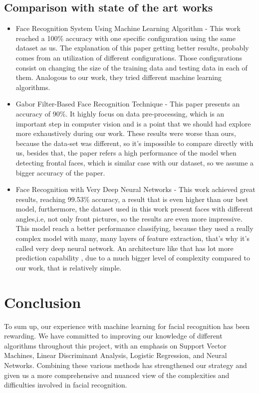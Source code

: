 \documentclass[12pt,a4paper,twocolumn]{article}
\begin{document}
\subsection{Comparison with state of the art works}
\begin{itemize}
    \item Face Recognition System Using Machine Learning Algorithm \cite{state1} - This work reached a 100\% accuracy with one specific configuration using the same dataset as us. The explanation of this paper getting better results, probably comes from an utilization of different configurations. Those configurations consist on  changing the size of the training data and testing data in each of them. Analogous to our work, they tried different machine learning algorithms.
    \item Gabor Filter-Based Face Recognition Technique\cite{state2} - This paper presents an accuracy of 90\%. It highly focus on data pre-processing, which is an important step in computer vision and is a point that we should had explore more exhaustively during our work. These results were worse than ours, because the data-set was different, so it's impossible to compare directly with us, besides that, the paper refers a high performance of the model when detecting frontal faces, which is similar case with our dataset, so we assume a bigger accuracy of the paper.
    \item  Face Recognition with Very Deep Neural Networks \cite{state3} - This work achieved great results, reaching 99.53\% accuracy, a result that is even higher than our best model, furthermore, the dataset used in this work present faces with different angles,i.e, not only front pictures, so the results are even more impressive. This model reach a better performance classifying, because they used a really complex model with many, many layers of feature extraction, that's why it's called very deep neural network. An architecture like that has lot more prediction capability , due to a much bigger level of complexity compared to our work, that is relatively simple.
\end{itemize}



\section{Conclusion}
To sum up, our experience with machine learning for facial recognition has been rewarding. We have committed to improving our knowledge of different algorithms throughout this project, with an emphasis on Support Vector Machines, Linear Discriminant Analysis, Logistic Regression, and Neural Networks. Combining these various methods has strengthened our strategy and given us a more comprehensive and nuanced view of the complexities and difficulties involved in facial recognition.
\end{document}
